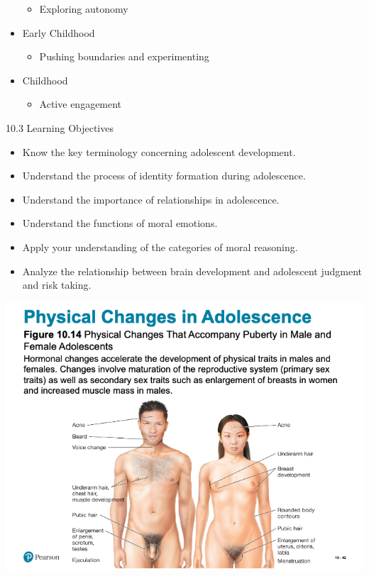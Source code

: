 \documentclass[
]{book}
\providecommand{\tightlist}{%
  \setlength{\itemsep}{0pt}\setlength{\parskip}{0pt}}
\begin{document}
\begin{reflect}
\begin{itemize}
  \begin{itemize}
  \tightlist
  \item
    Exploring autonomy\\
  \end{itemize}
\item
  Early Childhood

  \begin{itemize}
  \tightlist
  \item
    Pushing boundaries and experimenting\\
  \end{itemize}
\item
  Childhood

  \begin{itemize}
  \tightlist
  \item
    Active engagement
  \end{itemize}
\end{itemize}

10.3 Learning Objectives

\begin{itemize}
\tightlist
\item
  Know the key terminology concerning adolescent development.\\
\item
  Understand the process of identity formation during adolescence.\\
\item
  Understand the importance of relationships in adolescence.\\
\item
  Understand the functions of moral emotions.\\
\item
  Apply your understanding of the categories of moral reasoning.\\
\item
  Analyze the relationship between brain development and adolescent judgment and risk taking.
\end{itemize}

\includegraphics{assets/unit_3/slide_42.png}


\end{reflect}
\end{document}
